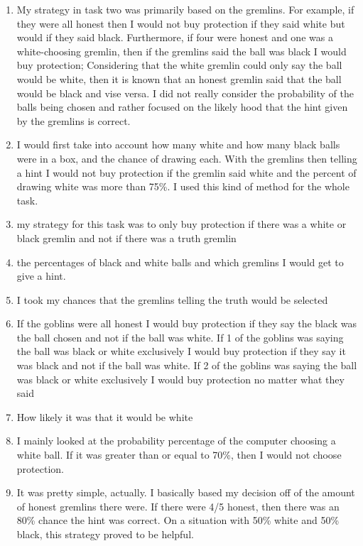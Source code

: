 \documentclass[12pt,a4paper]{article}
\begin{document}
\begin{enumerate}
\item My strategy in task two was primarily based on the gremlins. For example, if they were all honest then I would not buy protection if they said white but would if they said black. Furthermore, if four were honest and one was a white-choosing gremlin, then if the gremlins said the ball was black I would buy protection; Considering that the white gremlin could only say the ball would be white, then it is known that an honest gremlin said that the ball would be black and vise versa. I did not really consider the probability of the balls being chosen and rather focused on the likely hood that the hint given by the gremlins is correct.

\item I would first take into account how many white and how many black balls were in a box, and the chance of drawing each. With the gremlins then telling a hint I would not buy protection if the gremlin said white and the percent of drawing white was more than 75\%. I used this kind of method for the whole task.

\item my strategy for this task was to only buy protection if there was a white or black gremlin and not if there was a truth gremlin

\item the percentages of black and white balls and which gremlins I would get to give a hint.

\item I took my chances that the gremlins telling the truth would be selected

\item If the goblins were all honest I would buy protection if they say the black was the ball chosen and not if the ball was white. If 1 of the goblins was saying the ball was black or white exclusively I would buy protection if they say it was black and not if the ball was white. If 2 of the goblins was saying the ball was black or white exclusively I would buy protection no matter what they said

\item How likely it was that it would be white

\item I mainly looked at the probability percentage of the computer choosing a white ball. If it was greater than or equal to 70\%, then I would not choose protection.

\item It was pretty simple, actually. I basically based my decision off of the amount of honest gremlins there were. If there were 4/5 honest, then there was an 80\% chance the hint was correct. On a situation with 50\% white and 50\% black, this strategy proved to be helpful.


\end{enumerate}
\end{document}
